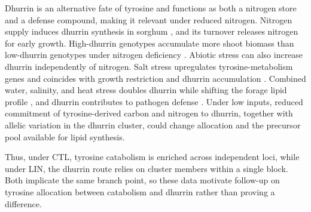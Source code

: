 Dhurrin is an alternative fate of tyrosine and functions as both a nitrogen store and a defense compound, making it relevant under reduced nitrogen. Nitrogen supply induces dhurrin synthesis in sorghum \citep{Busk2002Dhurrin}, and its turnover releases nitrogen for early growth. High-dhurrin genotypes accumulate more shoot biomass than low-dhurrin genotypes under nitrogen deficiency \citep{Emendack2025Dhurrin}. Abiotic stress can also increase dhurrin independently of nitrogen. Salt stress upregulates tyrosine-metabolism genes and coincides with growth restriction and dhurrin accumulation \citep{Amombo2026Tyrosine}. Combined water, salinity, and heat stress doubles dhurrin while shifting the forage lipid profile \citep{GiraldoAcosta2026Dhurrin}, and dhurrin contributes to pathogen defense \citep{Fall2025Dhurrin}. Under low inputs, reduced commitment of tyrosine-derived carbon and nitrogen to dhurrin, together with allelic variation in the dhurrin cluster, could change allocation and the precursor pool available for lipid synthesis.

Thus, under CTL, tyrosine catabolism is enriched across independent loci, while under LIN, the dhurrin route relies on cluster members within a single block. Both implicate the same branch point, so these data motivate follow-up on tyrosine allocation between catabolism and dhurrin rather than proving a difference.

